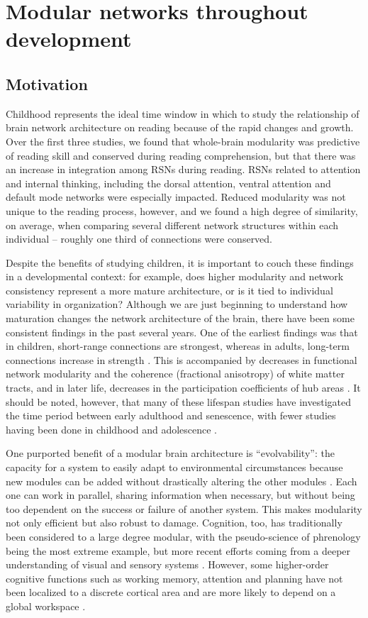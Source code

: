 \chapter{Modular networks throughout development}

\section{Motivation}

Childhood represents the ideal time window in which to study the relationship of brain network architecture on reading because of the rapid changes and growth. Over the first three studies, we found that whole-brain modularity was predictive of reading skill and conserved during reading comprehension, but that there was an increase in integration among RSNs during reading. RSNs related to attention and internal thinking, including the dorsal attention, ventral attention and default mode networks were especially impacted. Reduced modularity was not unique to the reading process, however, and we found a high degree of similarity, on average, when comparing several different network structures within each individual -- roughly one third of connections were conserved. 

Despite the benefits of studying children, it is important to couch these findings in a developmental context: for example, does higher modularity and network consistency represent a more mature architecture, or is it tied to individual variability in organization? Although we are just beginning to understand how maturation changes the network architecture of the brain, there have been some consistent findings in the past several years. One of the earliest findings was that in children, short-range connections are strongest, whereas in adults, long-term connections increase in strength \citep{Power2010, Chan2014}. This is accompanied by decreases in functional network modularity and the coherence (fractional anisotropy) of white matter tracts, and in later life, decreases in the participation coefficients of hub areas \citep{Betzel2014}. It should be noted, however, that many of these lifespan studies have investigated the time period between early adulthood and senescence, with fewer studies having been done in childhood and adolescence \citep{Cao2016}.

One purported benefit of a modular brain architecture is ``evolvability'': the capacity for a system to easily adapt to environmental circumstances because new modules can be added without drastically altering the other modules \citep{Kashtan2005}. Each one can work in parallel, sharing information when necessary, but without being too dependent on the success or failure of another system. This makes modularity not only efficient but also robust to damage. Cognition, too, has traditionally been considered to a large degree modular, with the pseudo-science of phrenology being the most extreme example, but more recent efforts coming from a deeper understanding of visual and sensory systems \citep{Barrett2006}. However, some higher-order cognitive functions such as working memory, attention and planning have not been localized to a discrete cortical area and are more likely to depend on a global workspace \citep{Dehaene1998}.

